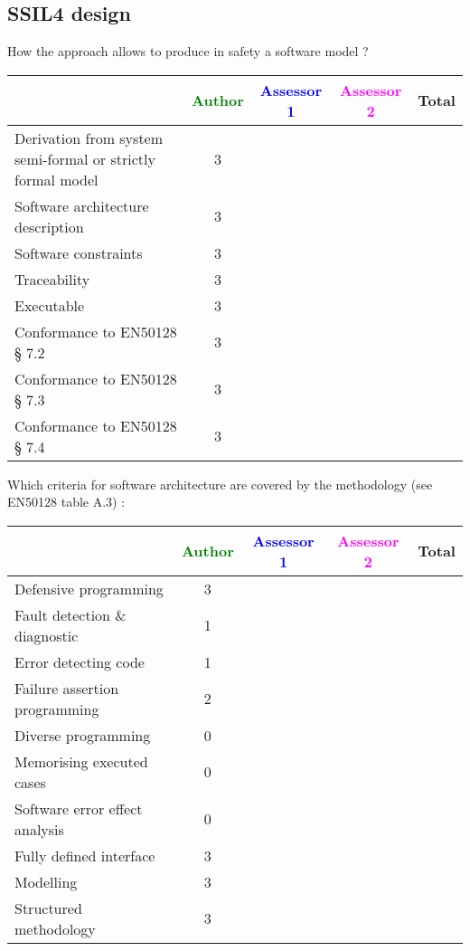 \subsection{SSIL4 design}

How the approach allows to  produce in safety a software model ?

\begin{tabular}{|l | c | c | c | c|}
\hline
& \textcolor{green}{Author} & \textcolor{blue}{Assessor 1} & \textcolor{magenta}{Assessor 2} & Total \\
\hline
Derivation from system semi-formal or strictly formal model  & 3 & & &  \\
\hline 
Software architecture description  & 3 & & &  \\
\hline
Software constraints  & 3 & & &  \\
\hline
Traceability  & 3 & & &  \\
\hline
Executable  & 3 & & &  \\
\hline
Conformance to EN50128 § 7.2  & 3 & & &  \\
\hline
Conformance to EN50128 § 7.3  & 3 & & &  \\
\hline
Conformance to EN50128 § 7.4  & 3 & & &  \\
\hline
\end{tabular}

Which criteria for software architecture are covered by the methodology
(see EN50128 table A.3) :

\begin{tabular}{|l | c | c | c | c|}
\hline
& \textcolor{green}{Author} & \textcolor{blue}{Assessor 1} & \textcolor{magenta}{Assessor 2} & Total \\
\hline
Defensive programming  & 3 & & &  \\
\hline 
Fault detection \& diagnostic  & 1 & & &  \\
\hline
Error detecting code  & 1 & & &  \\
\hline
Failure assertion programming & 2  & & &  \\
\hline
Diverse programming & 0 & & &  \\
\hline
Memorising executed cases & 0 & & &  \\
\hline
Software error effect analysis & 0 & & &  \\
\hline
Fully defined interface & 3 & & &  \\
\hline
Modelling  & 3 & & &  \\
\hline
Structured methodology & 3 & & &  \\
\hline
\end{tabular}

